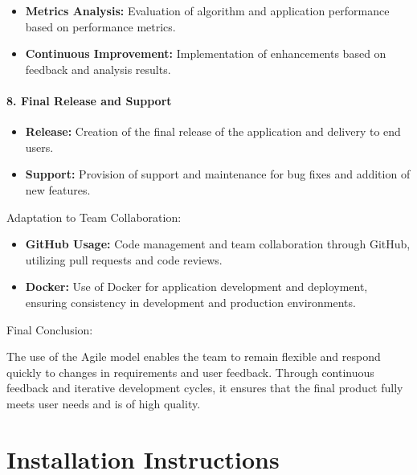 \documentclass[unnumsec,webpdf,contemporary,large]{oup-authoring-template}%
\theoremstyle{thmstyleone}%
\theoremstyle{thmstyletwo}%
\theoremstyle{thmstylethree}%
\begin{document}
\begin{itemize}
    \item \textbf{Metrics Analysis:} Evaluation of algorithm and application performance based on performance metrics.
    \item \textbf{Continuous Improvement:} Implementation of enhancements based on feedback and analysis results.
\end{itemize}
\vspace{0.1cm}

\paragraph{8. Final Release and Support}
\vspace{0.2cm}

\begin{itemize}
    \item \textbf{Release:} Creation of the final release of the application and delivery to end users.
    \item \textbf{Support:} Provision of support and maintenance for bug fixes and addition of new features.
\end{itemize}
\vspace{0.1cm}

Adaptation to Team Collaboration:

\begin{itemize}
    \item \textbf{GitHub Usage:} Code management and team collaboration through GitHub, utilizing pull requests and code reviews.
   \item \textbf{Docker:} Use of Docker for application development and deployment, ensuring consistency in development and production environments.
\end{itemize}

Final Conclusion:
\vspace{0.2cm}

The use of the Agile model enables the team to remain flexible and respond quickly to changes in requirements and user feedback. Through continuous feedback and iterative development cycles, it ensures that the final product fully meets user needs and is of high quality.

\section{Installation Instructions}
\vspace{0.2cm}
\end{document}
